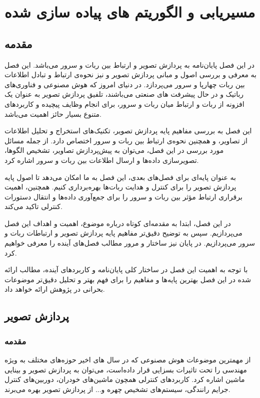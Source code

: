 \chapter{مسیریابی و الگوریتم های پیاده سازی شده}
\label{chapter2}
\section{مقدمه}

در این فصل پایان‌نامه به پردازش تصویر و ارتباط بین ربات و سرور می‌باشد. این فصل به معرفی و بررسی اصول و مبانی پردازش تصویر و نیز نحوه‌ی ارتباط و تبادل اطلاعات بین ربات چهارپا و سرور می‌پردازد. در دنیای امروز که هوش مصنوعی و فناوری‌های رباتیک و در حال پیشرفت های صنعتی می‌باشند، تلفیق پردازش تصویر به عنوان یک افزونه از ربات و ارتباط میان ربات و سرور، برای انجام وظایف پیچیده و کاربردهای متنوع بسیار حائز اهمیت می‌باشد.

این فصل به بررسی مفاهیم پایه پردازش تصویر، تکنیک‌های استخراج و تحلیل اطلاعات از تصاویر، و همچنین نحوه‌ی ارتباط بین ربات و سرور اختصاص دارد. از جمله مسائل مورد بررسی در این فصل، می‌توان به پیش‌پردازش تصاویر، تشخیص الگوها، تصویرسازی داده‌ها و ارسال اطلاعات بین ربات و سرور اشاره کرد.

به عنوان پایه‌ای برای فصل‌های بعدی، این فصل به ما امکان می‌دهد تا اصول پایه پردازش تصویر را برای کنترل و هدایت ربات‌ها بهره‌برداری کنیم. همچنین، اهمیت برقراری ارتباط مؤثر بین ربات و سرور را برای جمع‌آوری داده‌ها و انتقال دستورات کنترلی تاکید می‌کند.

در این فصل، ابتدا به مقدمه‌ای کوتاه درباره موضوع، اهمیت و اهداف این فصل می‌پردازیم. سپس به توضیح دقیق‌تر مفاهیم پایه پردازش تصویر و ارتباطات ربات و سرور می‌پردازیم. در پایان نیز ساختار و مرور مطالب فصل‌های آینده را معرفی خواهیم کرد.

با توجه به اهمیت این فصل در ساختار کلی پایان‌نامه و کاربردهای آینده، مطالب ارائه شده در این فصل بهترین پایه‌ها و مفاهیم را برای فهم بهتر و تحلیل دقیق‌تر موضوعات بحرانی در پژوهش ارائه خواهد داد.
\section{پردازش تصویر}
\subsection{مقدمه}

از مهمترین موضوعات هوش مصنوعی که در سال های اخیر حوزه‌های مختلف به ویژه مهندسی را تحت تاثیرات بسزایی قرار داده‌است، می‌توان به پردازش تصویر و بینایی ماشین اشاره کرد. کاربردهای کنترلی همچون ماشین‌های خودران، دوربین‌های کنترل جرایم رانندگی، سیستم‌های تشخیص چهره و... از پردازش تصویر بهره می‌برند.
\newpage
